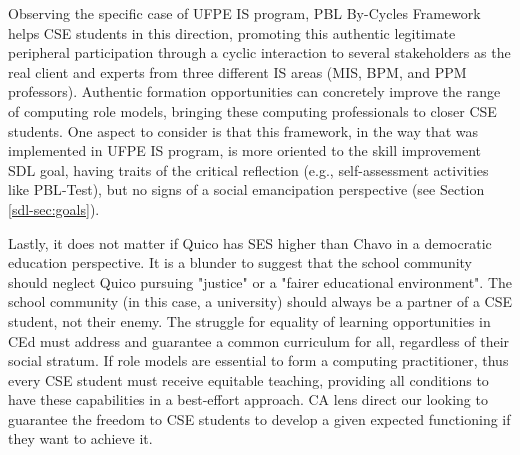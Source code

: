 Observing the specific case of \acrshort{UFPE} \acrshort{IS} program, \acrshort{PBL} By-Cycles Framework helps \gls{CSE} students in this direction, promoting this authentic legitimate peripheral participation through a cyclic interaction to several stakeholders as the real client and experts from three different \gls{IS} areas (\gls{MIS}, \gls{BPM}, and \gls{PPM} professors). Authentic formation opportunities can concretely improve the range of computing role models, bringing these computing professionals to closer \gls{CSE} students. One aspect to consider is that this framework, in the way that was implemented in \acrshort{UFPE} \acrshort{IS} program, is more oriented to the skill improvement \gls{SDL} goal, having traits of the critical reflection (e.g., self-assessment activities like \acrshort{PBL}-Test), but no signs of a social emancipation perspective (see Section \ref{sdl-sec:goals}).

Lastly, it does not matter if Quico has \gls{SES} higher than Chavo in a democratic education perspective. It is a blunder to suggest that the school community should neglect Quico pursuing "justice" or a "fairer educational environment". The school community (in this case, a university) should always be a partner of a \gls{CSE} student, not their enemy. The struggle for equality of learning opportunities in \gls{CEd} must address and guarantee a common curriculum for all, regardless of their social stratum. If role models are essential to form a computing practitioner, thus every \gls{CSE} student must receive equitable teaching, providing all conditions to have these capabilities in a best-effort approach. \gls{CA} lens direct our looking to guarantee the freedom to \gls{CSE} students to develop a given expected functioning if they want to achieve it.

    
